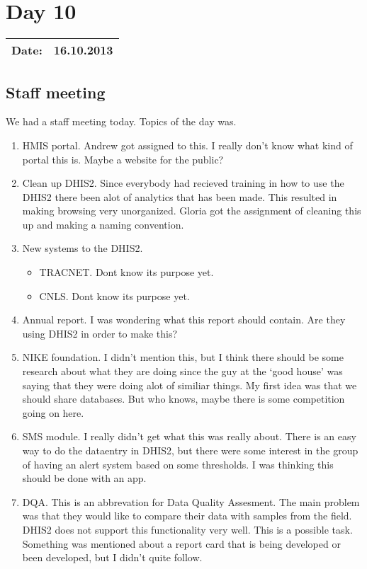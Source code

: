 \section{Day 10}
\begin{tabular}{|c|c|}
\hline
Date: & 16.10.2013 \\
\hline
\end{tabular}
\subsection{Staff meeting}
We had a staff meeting today. Topics of the day was.
\begin{enumerate}
\item HMIS portal. Andrew got assigned to this. I really don't know what kind of portal this is. Maybe a website for the public?
\item Clean up DHIS2. Since everybody had recieved training in how to use the DHIS2 there been alot of analytics that has been made. This resulted in making browsing very unorganized. Gloria got the assignment of cleaning this up and making a naming convention.
\item New systems to the DHIS2.
	\begin{itemize}
	\item TRACNET. Dont know its purpose yet.
	\item CNLS. Dont know its purpose yet.
	\end{itemize}
\item Annual report. I was wondering what this report should contain. Are they using DHIS2 in order to make this?
\item NIKE foundation. I didn't mention this, but I think there should be some research about what they are doing since the guy at the `good house' was saying that they were doing alot of similiar things. My first idea was that we should share databases. But who knows, maybe there is some competition going on here.
\item SMS module. I really didn't get what this was really about. There is an easy way to do the dataentry in DHIS2, but there were some interest in the group of having an alert system based on some thresholds. I was thinking this should be done with an app.
\item DQA. This is an abbrevation for Data Quality Assesment. The main problem was that they would like to compare their data with samples from the field. DHIS2 does not support this functionality very well. This is a possible task. Something was mentioned about a report card that is being developed or been developed, but I didn't quite follow.

\end{enumerate}
